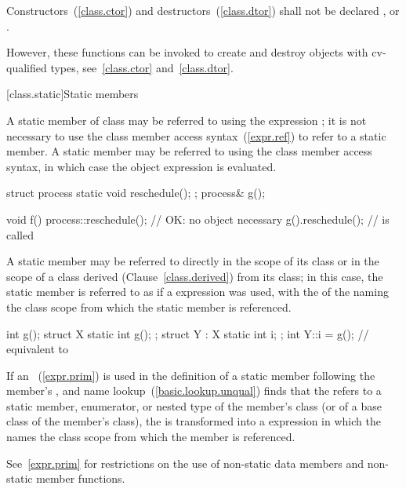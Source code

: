\pnum
{}%
%
%
%
Constructors~(\ref{class.ctor}) and destructors~(\ref{class.dtor}) shall
not be declared ,  or 
. \begin{note} However, these functions can be invoked to
create and destroy objects with cv-qualified types,
see~\ref{class.ctor} and~\ref{class.dtor}.
\end{note}

[class.static]{Static members}%
%

\pnum
A static member  of class  may be referred to
using the  expression ; it is not
necessary to use the class member access syntax~(\ref{expr.ref}) to
refer to a static member. A static member may be
referred to using the class member access syntax, in which case the
object expression is evaluated.
\begin{example}

\begin{codeblock}
struct process {
  static void reschedule();
};
process& g();

void f() {
  process::reschedule();        // OK: no object necessary
  g().reschedule();             //  is called
}
\end{codeblock}
\end{example}

\pnum
A static member may be referred to directly in the scope of its
class or in the scope of a class derived (Clause~\ref{class.derived})
from its class; in this case, the static member is referred to
as if a  expression was used, with the
 of the  naming
the class scope from which the static member is referenced.
\begin{example}

\begin{codeblock}
int g();
struct X {
  static int g();
};
struct Y : X {
  static int i;
};
int Y::i = g();                 // equivalent to 
\end{codeblock}
\end{example}

\pnum
If an ~(\ref{expr.prim}) is used in the
definition of a static member following the member's
, and name lookup~(\ref{basic.lookup.unqual})
finds that the  refers to a static
member, enumerator, or nested type of the member's class (or of a base
class of the member's class), the  is
transformed into a  expression in which the
 names the class scope from which the
member is referenced.
\begin{note}
See~\ref{expr.prim} for restrictions on the use of non-static data
members and non-static member functions.
\end{note}


